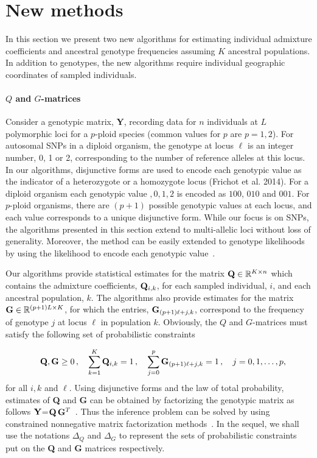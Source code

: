 \clearpage
\newpage

\section{New methods}


In this section we present two new algorithms for estimating individual
admixture coefficients and ancestral genotype frequencies assuming $K$ ancestral
populations. In addition to genotypes, the new algorithms require individual
geographic coordinates of sampled individuals.

\paragraph{$Q$ and $G$-matrices} Consider a genotypic matrix, {\bf Y}, recording
data for $n$ individuals at $L$ polymorphic loci for a $p$-ploid species (common
values for $p$ are $p = 1,2$). For autosomal SNPs in a diploid organism, the
genotype at locus $\ell$ is an integer number, 0, 1 or 2, corresponding to the
number of reference alleles at this locus. In our algorithms, disjunctive forms
are used to encode each genotypic value as the indicator of a heterozygote or a
homozygote locus (Frichot et al. 2014). For a diploid organism each genotypic
value $,0,1,2$ is encoded as $100$, $010$ and $001$. For $p$-ploid organisms,
there are $(p+1)$ possible genotypic values at each locus, and each value
corresponds to a unique disjunctive form. While our focus is on SNPs, the
algorithms presented in this section extend to multi-allelic loci without loss
of generality. Moreover, the method can be easily extended to genotype
likelihoods by using the likelihood to encode each genotypic
value~\citep{Korneliussen2014}.

Our algorithms provide statistical estimates for the matrix ${\bf Q} \in
\mathbb{R}^{K \times n}$ which contains the admixture coefficients, ${\bf
  Q}_{i,k}$, for each sampled individual, $i$, and each ancestral population,
$k$. The algorithms also provide estimates for the matrix ${\bf G} \in
\mathbb{R}^{(p+1)L \times K}$, for which the entries, ${\bf G}_{(p+1)\ell + j,
  k}$, correspond to the frequency of genotype $j$ at locus $\ell$ in population
$k$. Obviously, the $Q$ and $G$-matrices must satisfy the following set of
probabilistic constraints

$$
\quad {\bf Q},{\bf G} \geq 0 \, , \quad \sum_{k=1}^K {\bf Q}_{i,k} = 1 \, ,
\quad \sum_{j=0}^p {\bf G}_{(p+1)\ell + j, k} = 1 \, , \quad j = 0,1,\dots, p,
$$
for all $i, k$ and $\ell$. Using disjunctive forms and the law of total
probability, estimates of {\bf Q} and {\bf G} can be obtained by factorizing the
genotypic matrix as follows ${\bf Y}$=${\bf Q}\,{\bf G}^T$~\citep{Frichot2014}.
Thus the inference problem can be solved by using constrained nonnegative matrix
factorization methods~\citep{Lee1999, Cichocki2009}. In the sequel, we shall use
the notations $\Delta_Q$ and $\Delta_G$ to represent the sets of probabilistic
constraints put on the {\bf Q} and {\bf G} matrices respectively.


